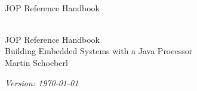 \setcounter{page}{1}

\begin{flushleft}
\pagestyle{empty}
\ \\
\vspace{1cm}
{\mdseries\huge JOP Reference Handbook\\
}
\cleardoublepage
\end{flushleft}


\begin{flushleft}
\pagestyle{empty}
\ \\
\vspace{1cm}
{\Huge JOP Reference Handbook\\
\mdseries
{\Large Building Embedded Systems with a Java Processor}\\
\bigskip
\bigskip
\bigskip
{\huge Martin Schoeberl}
\medskip\\

}


\vspace{10cm} \emph{Version: \today}
\newpage
\end{flushleft}




